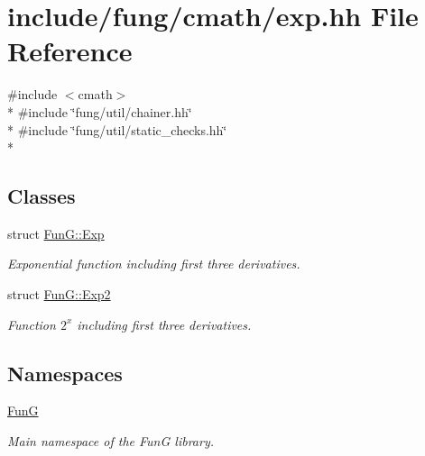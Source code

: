 \hypertarget{exp_8hh}{}\section{include/fung/cmath/exp.hh File Reference}
\label{exp_8hh}
{\ttfamily \#include $<$cmath$>$}\\*
{\ttfamily \#include \char`\"{}fung/util/chainer.\+hh\char`\"{}}\\*
{\ttfamily \#include \char`\"{}fung/util/static\+\_\+checks.\+hh\char`\"{}}\\*
\subsection*{Classes}
\begin{DoxyCompactItemize}
\item 
struct \hyperlink{structFunG_1_1Exp}{Fun\+G\+::\+Exp}
\begin{DoxyCompactList}\small\item\em Exponential function including first three derivatives. \end{DoxyCompactList}\item 
struct \hyperlink{structFunG_1_1Exp2}{Fun\+G\+::\+Exp2}
\begin{DoxyCompactList}\small\item\em Function $2^x$ including first three derivatives. \end{DoxyCompactList}\end{DoxyCompactItemize}
\subsection*{Namespaces}
\begin{DoxyCompactItemize}
\item 
 \hyperlink{namespaceFunG}{FunG}
\begin{DoxyCompactList}\small\item\em Main namespace of the FunG library. \end{DoxyCompactList}\end{DoxyCompactItemize}
